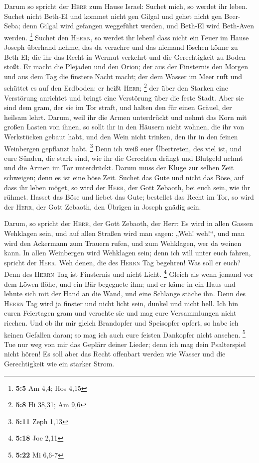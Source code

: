  Darum so spricht der \textsc{Herr} zum Hause Israel:
Suchet mich, so werdet ihr leben.  Suchet nicht Beth-El
und kommet nicht gen Gilgal und gehet nicht gen Beer-Seba; denn Gilgal
wird gefangen weggeführt werden, und Beth-El wird Beth-Aven werden.
\footnote{\textbf{5:5} Am 4,4; Hos 4,15}  Suchet den
\textsc{Herrn}, so werdet ihr leben! dass nicht ein Feuer im Hause
Joseph überhand nehme, das da verzehre und das niemand löschen könne zu
Beth-El;  die ihr das Recht in Wermut verkehrt und die
Gerechtigkeit zu Boden stoßt.  Er macht die Plejaden und
den Orion; der aus der Finsternis den Morgen und aus dem Tag die
finstere Nacht macht; der dem Wasser im Meer ruft und schüttet es auf
den Erdboden: er heißt \textsc{Herr}; \footnote{\textbf{5:8} Hi 38,31;
  Am 9,6}  der über den Starken eine Verstörung anrichtet
und bringt eine Verstörung über die feste Stadt.  Aber
sie sind dem gram, der sie im Tor straft, und halten den für einen
Gräuel, der heilsam lehrt.  Darum, weil ihr die Armen
unterdrückt und nehmt das Korn mit großen Lasten von ihnen, so sollt ihr
in den Häusern nicht wohnen, die ihr von Werkstücken gebaut habt, und
den Wein nicht trinken, den ihr in den feinen Weinbergen gepflanzt habt.
\footnote{\textbf{5:11} Zeph 1,13}  Denn ich weiß euer
Übertreten, des viel ist, und eure Sünden, die stark sind, wie ihr die
Gerechten drängt und Blutgeld nehmt und die Armen im Tor unterdrückt.
 Darum muss der Kluge zur selben Zeit schweigen; denn es
ist eine böse Zeit.  Suchet das Gute und nicht das Böse,
auf dass ihr leben möget, so wird der \textsc{Herr}, der Gott Zebaoth,
bei euch sein, wie ihr rühmet.  Hasset das Böse und
liebet das Gute; bestellet das Recht im Tor, so wird der \textsc{Herr},
der Gott Zebaoth, den Übrigen in Joseph gnädig sein.

 Darum, so spricht der \textsc{Herr}, der Gott Zebaoth,
der Herr: Es wird in allen Gassen Wehklagen sein, und auf allen Straßen
wird man sagen: „Weh! weh!{}``, und man wird den Ackermann zum Trauern
rufen, und zum Wehklagen, wer da weinen kann.  In allen
Weinbergen wird Wehklagen sein; denn ich will unter euch fahren, spricht
der \textsc{Herr}.  Weh denen, die des \textsc{Herrn} Tag
begehren! Was soll er euch? Denn des \textsc{Herrn} Tag ist Finsternis
und nicht Licht. \footnote{\textbf{5:18} Joe 2,11} 
Gleich als wenn jemand vor dem Löwen flöhe, und ein Bär begegnete ihm;
und er käme in ein Haus und lehnte sich mit der Hand an die Wand, und
eine Schlange stäche ihn.  Denn des \textsc{Herrn} Tag
wird ja finster und nicht licht sein, dunkel und nicht hell.
 Ich bin euren Feiertagen gram und verachte sie und mag
eure Versammlungen nicht riechen.  Und ob ihr mir gleich
Brandopfer und Speisopfer opfert, so habe ich keinen Gefallen daran; so
mag ich auch eure feisten Dankopfer nicht ansehen. \footnote{\textbf{5:22}
  Mi 6,6-7}  Tue nur weg von mir das Geplärr deiner
Lieder; denn ich mag dein Psalterspiel nicht hören!  Es
soll aber das Recht offenbart werden wie Wasser und die Gerechtigkeit
wie ein starker Strom.

